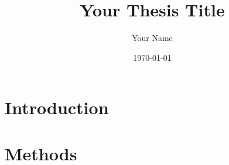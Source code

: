 \documentclass[12pt]{report}
\begin{document}
\title{Your Thesis Title}
\author{Your Name}
\date{\today}
\maketitle

\tableofcontents

\chapter{Introduction}


\chapter{Methods}




\end{document}
